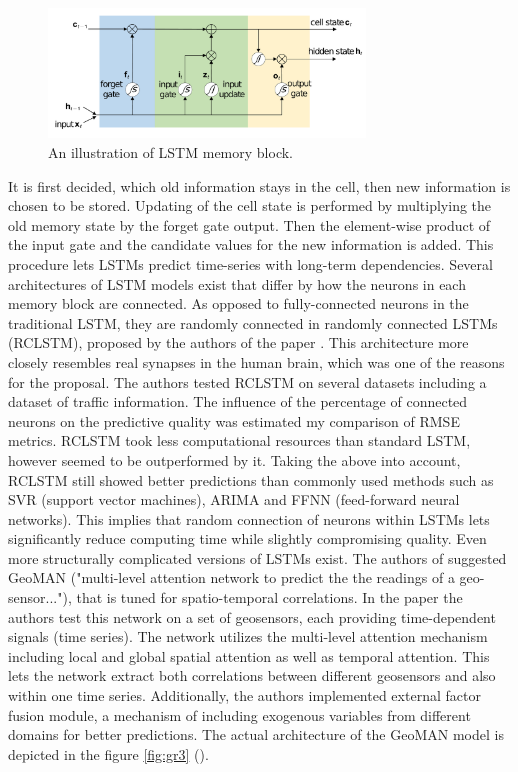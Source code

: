 \documentclass[3p,times,procedia]{elsarticle}
\begin{document}
\begin{enumerate}
\begin{figure}[t]\vspace*{4pt}
	\centerline{\includegraphics[width=0.75\textwidth]{./visuals/gr2.pdf}}
\caption{An illustration of LSTM memory block.}
\label{fig:gr2}
\end{figure}
It is first decided, which old information stays in the cell, then new information is chosen to be stored. Updating of the cell state is performed by multiplying the old memory state by the forget gate output. Then the element-wise product of the input gate and the candidate values for the new information is added. This procedure lets LSTMs predict time-series with long-term dependencies. Several architectures of LSTM models exist that differ by how the neurons in each memory block are connected. As opposed to fully-connected neurons in the traditional LSTM, they are randomly connected in randomly connected LSTMs (RCLSTM), proposed by the authors of the paper \cite{hua2019deep}. This architecture more closely resembles real synapses in the human brain, which was one of the reasons for the proposal. The authors tested RCLSTM on several datasets including a dataset of traffic information. The influence of the percentage of connected neurons on the predictive quality was estimated my comparison of RMSE metrics. RCLSTM took less computational resources than standard LSTM, however seemed to be outperformed by it. Taking the above into account, RCLSTM still showed better predictions than commonly used methods such as SVR (support vector machines), ARIMA and FFNN (feed-forward neural networks). This implies that random connection of neurons within LSTMs lets significantly reduce computing time while slightly compromising quality.
Even more structurally complicated versions of LSTMs exist. The authors of \cite{liang2018geoman} suggested GeoMAN ("multi-level attention network to predict the the readings of a geo-sensor..."), that is tuned for spatio-temporal correlations. In the paper the authors test this network on a set of geosensors, each providing time-dependent signals (time series). The network utilizes the multi-level attention mechanism including local and global spatial attention as well as temporal attention. This lets the network extract both correlations between different geosensors and also within one time series. Additionally, the authors implemented external factor fusion module, a mechanism of including exogenous variables from different domains for better predictions. The actual architecture of the GeoMAN model is depicted in the figure \ref{fig:gr3} (\cite{liang2018geoman}).

\end{enumerate}
\end{document}
